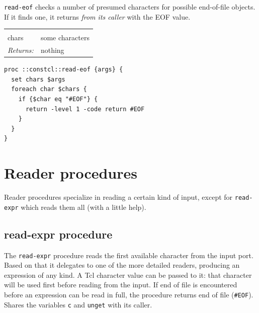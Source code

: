 \documentclass[twoside,9pt]{report}
\begin{document}
\texttt{read-eof} checks a number of presumed characters for possible end-of-file objects. If it finds one, it returns \emph{from its caller} with the EOF value.

\noindent\begin{tabular}{ |p{1.9cm} p{8cm}| }
\hline
\rowcolor[HTML]{CCCCCC} \multicolumn{2}{|l|}{\bf read-eof (internal)} \\
chars & some characters \\
\textit{Returns:} & nothing \\
\hline
\end{tabular}
\begin{lstlisting}
proc ::constcl::read-eof {args} {
  set chars $args
  foreach char $chars {
    if {$char eq "#EOF"} {
      return -level 1 -code return #EOF
    }
  }
}
\end{lstlisting}
\section{Reader procedures}
\label{reader-procedures}


Reader procedures specialize in reading a certain kind of input, except for \texttt{read-expr} which reads them all (with a little help).

\subsection{read-expr procedure}
\label{read-expr-procedure}


The \texttt{read-expr} procedure reads the first available character from the input port. Based on that it delegates to one of the more detailed readers, producing an expression of any kind. A Tcl character value can be passed to it: that character will be used first before reading from the input. If end of file is encountered before an expression can be read in full, the procedure returns end of file (\texttt{\#EOF}). Shares the variables \texttt{c} and \texttt{unget} with its caller.
\end{document}
